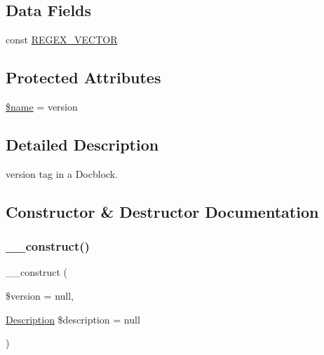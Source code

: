\subsection*{Data Fields}
\begin{DoxyCompactItemize}
\item 
const \mbox{\hyperlink{classphp_documentor_1_1_reflection_1_1_doc_block_1_1_tags_1_1_version_aec4feb4c31b9abab8a40577d90b872f8}{R\+E\+G\+E\+X\+\_\+\+V\+E\+C\+T\+OR}}
\end{DoxyCompactItemize}
\subsection*{Protected Attributes}
\begin{DoxyCompactItemize}
\item 
\mbox{\hyperlink{classphp_documentor_1_1_reflection_1_1_doc_block_1_1_tags_1_1_version_ab2fc40d43824ea3e1ce5d86dee0d763b}{\$name}} = \textquotesingle{}version\textquotesingle{}
\end{DoxyCompactItemize}


\subsection{Detailed Description}
version tag in a Docblock. 

\subsection{Constructor \& Destructor Documentation}
\mbox{\label{classphp_documentor_1_1_reflection_1_1_doc_block_1_1_tags_1_1_version_a75f67561d733f42ea52230c5b289d264}} 
\subsubsection{\texorpdfstring{\+\_\+\+\_\+construct()}{\_\_construct()}}
{\footnotesize\ttfamily \+\_\+\+\_\+construct (\begin{DoxyParamCaption}\item[{}]{\$version = {\ttfamily null},  }\item[{\mbox{\hyperlink{classphp_documentor_1_1_reflection_1_1_doc_block_1_1_description}{Description}}}]{\$description = {\ttfamily null} }\end{DoxyParamCaption})}



